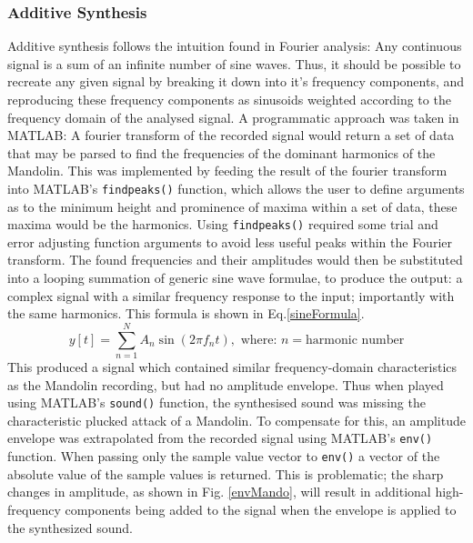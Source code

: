 \documentclass{article}
\begin{document}
        \subsubsection{Additive Synthesis}
            Additive synthesis follows the intuition found in Fourier analysis: Any continuous signal is a sum of an infinite number of sine waves.
            Thus, it should be possible to recreate any given signal by breaking it down into it's frequency components, and reproducing these frequency components as sinusoids weighted according to the frequency domain of the analysed signal.
            A programmatic approach was taken in MATLAB: A fourier transform of the recorded signal would return a set of data that may be parsed to find the frequencies of the dominant harmonics of the Mandolin.
            This was implemented by feeding the result of the fourier transform into MATLAB's \texttt{findpeaks()} function, which allows the user to define arguments as to the minimum height and prominence of maxima within a set of data, these maxima would be the harmonics.
            Using \texttt{findpeaks()} required some trial and error adjusting function arguments to avoid less useful peaks within the Fourier transform.
            The found frequencies and their amplitudes would then be substituted into a looping summation of generic sine wave formulae, to produce the output: a complex signal with a similar frequency response to the input; importantly with the same harmonics.
            This formula is shown in Eq.\ref{sineFormula}.
            \begin{equation}
                y[t] = \sum_{n=1}^{N} A_n \sin{(2 \pi f_n t)}, \text{ where: } n = \text{harmonic number}
                \label{sineFormula}
            \end{equation}
            This produced a signal which contained similar frequency-domain characteristics as the Mandolin recording, but had no amplitude envelope.
            Thus when played using MATLAB's \texttt{sound()} function, the synthesised sound was missing the characteristic plucked attack of a Mandolin.
            To compensate for this, an amplitude envelope was extrapolated from the recorded signal using MATLAB's \texttt{env()} function.
            When passing only the sample value vector to \texttt{env()} a vector of the absolute value of the sample values is returned.
            This is problematic; the sharp changes in amplitude, as shown in Fig. \ref{envMando}, will result in additional high-frequency components being added to the signal when the envelope is applied to the synthesized sound.
\end{document}
